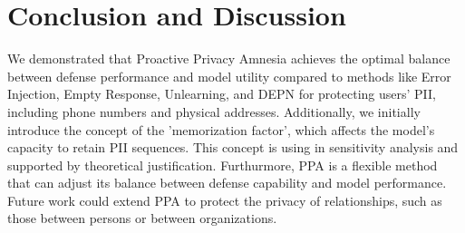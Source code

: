 
\begin{comment}
\section{Conclusion and Discussion\label{conclusion_and_discussion}}
Unlearning is a promising method that enables LLMs to forget a person's PII. However, if this method is applied to protect the PII of 200 to 400 persons, it may cause the LLMs' performance to collapse. This limitation significantly restricts its practical usage. In this work, we propose the Dynamic Mix Selected Unlearning to protect a person's PII while maintaining LLMs' model performance. We conduct comprehensive experiments to support the effectiveness of our proposals.

\textbf{Limitation.} The stages of selective unlearning and error injection in Dynamic Mix Selected Unlearning require fine-tuning all parameters in LLMs, which may be costly for users lacking computational resources. 

\textbf{Future work.} Better understand the interplay of the three techniques that allow for effective performance in both preventing model memorization and maintaining model performance.  The future of Dynamic Mix Selected Unlearning can extend to more general information, such as the relationship between persons and authorities.
\end{comment}

\section{Conclusion and Discussion\label{conclusion_and_discussion}}
We demonstrated that Proactive Privacy Amnesia achieves the optimal balance between defense performance and model utility compared to methods like Error Injection, Empty Response, Unlearning, and DEPN for protecting users' PII, including phone numbers and physical addresses. Additionally, we initially introduce the concept of the 'memorization factor', which affects the model's capacity to retain PII sequences. This concept is using in sensitivity analysis and supported by theoretical justification. Furthurmore, PPA is a flexible method that can adjust its balance between defense capability and model performance. Future work could extend PPA to protect the privacy of relationships, such as those between persons or between organizations. 


